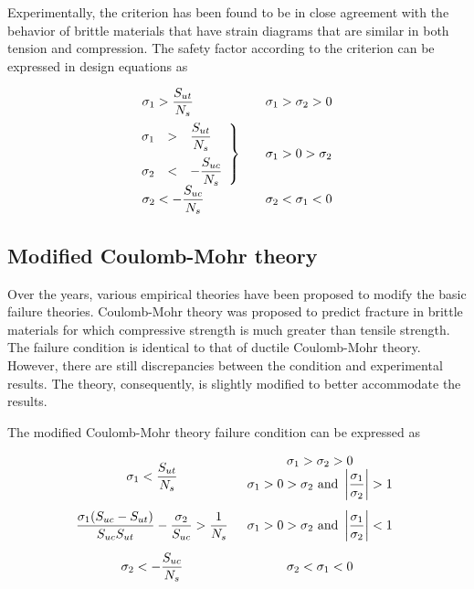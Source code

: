 \documentclass[
10pt,
a4paper,
openany,
svgnames,
]{book}
\begin{document}
Experimentally, the criterion has been found to be in close agreement with the behavior of brittle materials that have strain diagrams that are similar in both tension and compression. The safety factor according to the criterion can be expressed in design equations as

\begin{equation}
  \begin{array}{l l l}
  \sigma_1 > \dfrac{S_{ut}}{N_s} & & \sigma_1 > \sigma_2 > 0 \\[10pt]
  \left. \hspace{-0.23cm}
  \begin{array}{l l l}
    \sigma_1 & > & \dfrac{S_{ut}}{N_s} \\[10pt]
    \sigma_2 & < & -\dfrac{S_{uc}}{N_s}
    \end{array} \right\} & & \sigma_1 > 0 > \sigma_2 \\[10pt]
    \sigma_2 <  - \dfrac{S_{uc}}{N_s} & & \sigma _2 < \sigma _1 < 0
  \end{array}
\end{equation}

\subsection{Modified Coulomb-Mohr theory}

Over the years, various empirical theories have been proposed to modify the basic failure theories. Coulomb-Mohr theory was proposed to predict fracture in brittle materials for which compressive strength is much greater than tensile strength. The failure condition is identical to that of ductile Coulomb-Mohr theory. However, there are still discrepancies between the condition and experimental results. The theory, consequently, is slightly modified to better accommodate the results.

The modified Coulomb-Mohr theory failure condition can be expressed as

\begin{equation}
  \begin{array}{c c}
    \sigma_1 < \dfrac{S_{ut}}{N_s} &
      \begin{array}{c}
        \sigma_1 > \sigma_2 > 0 \\ 
        \sigma_1 > 0 > \sigma_2 \text{ and } \left| \dfrac{\sigma_1}{\sigma_2} \right| > 1 
      \end{array} \\[20pt]
    \dfrac{\sigma_1(S_{uc} - S_{ut})}{S_{uc}S_{ut}} - \dfrac{\sigma_2}{S_{uc}} >
      \dfrac{1}{N_s} & \sigma_1 > 0 > \sigma_2\text{ and }\left| \dfrac{\sigma_1}{\sigma_2} \right| < 1 \\[15pt]
    \sigma_2 <  -\dfrac{S_{uc}}{N_s} & \sigma_2 < \sigma_1 < 0 
  \end{array}
\end{equation} 
\end{document}
